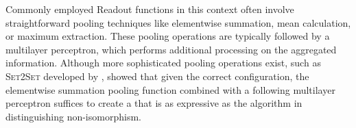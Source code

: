 \begin{table}[!htb]
    \centering
    \caption{Overview of the construction of the message-passing layers and their respective learnable parameters by popular \gnn model. This format is inspired by \cite{Nikolentzos2023}.}
    \label{tab:models}
\end{table}

Commonly employed \textsf{Readout} functions in this context often involve straightforward pooling techniques like elementwise summation, mean calculation, or maximum extraction. These pooling operations are typically followed by a multilayer perceptron, which performs additional processing on the aggregated information. Although more sophisticated pooling operations exist, such as \textsc{Set2Set} developed by \cite{Vinyals2015}, \cite{Xu2018} showed that given the correct configuration, the elementwise summation pooling function combined with a following multilayer perceptron suffices to create a \gnn that is as expressive as the \wl algorithm in distinguishing non-isomorphism.

